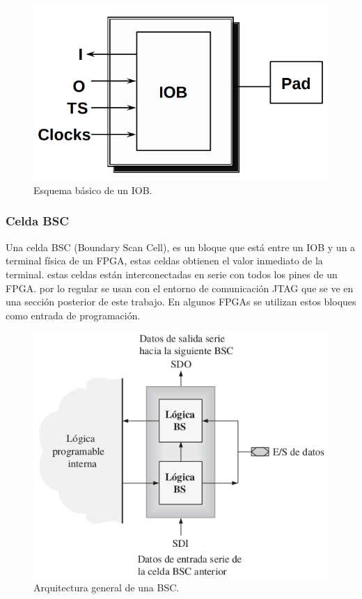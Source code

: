 \documentclass[twoside,spanish,ESP,MSc]{plantillaLabUPV}
\theoremstyle{definition}
\newcommand{\fs}{FPGAs }
\begin{document}
\begin{figure}[h]
\centering
\includegraphics[scale=0.3]{ima/iob.png}
\caption{Esquema básico de un IOB. %
\label{iob}}
\end{figure}


\subsubsection*{Celda BSC}

Una celda BSC (Boundary Scan Cell), es un bloque que está entre un IOB y un a terminal física de un FPGA, estas celdas obtienen el valor inmediato de la terminal. estas celdas están interconectadas en serie con todos los pines de un FPGA. por lo regular se usan con el entorno de comunicación JTAG que se ve en una sección posterior de este trabajo. En algunos \fs se utilizan estos bloques como entrada de programación. 

\begin{figure}[h]
\centering
\includegraphics[scale=0.45]{ima/BSC.png}
\caption{Arquitectura general de una BSC.%
\label{bsc}}
\end{figure}
\end{document}

